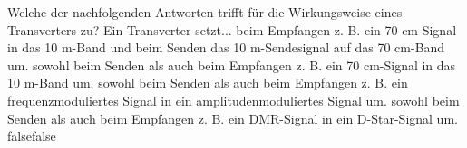     {Welche der nachfolgenden Antworten trifft für die Wirkungsweise eines Transverters zu? Ein Transverter setzt...}
    {beim Empfangen z. B. ein 70 cm-Signal in das 10 m-Band und beim Senden das 10 m-Sendesignal auf das 70 cm-Band um.}
    {sowohl beim Senden als auch beim Empfangen z. B. ein 70 cm-Signal in das 10 m-Band um.}
    {sowohl beim Senden als auch beim Empfangen z. B. ein frequenzmoduliertes Signal in ein amplitudenmoduliertes Signal um.}
    {sowohl beim Senden als auch beim Empfangen z. B. ein DMR-Signal in ein D-Star-Signal um.}
    {false}{false}